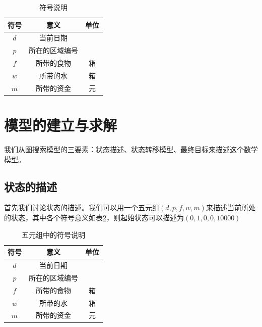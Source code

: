\documentclass[withoutpreface,bwprint]{cumcmthesis} %
\begin{document}
\begin{table}[!htbp]
    \caption{符号说明}\label{tab:001} \centering
    \begin{tabular}{ccc}
        \toprule[1.5pt]
        符号 & 意义 & 单位\\
        \midrule[1pt]
        $d$ & 当前日期 & \\
        $p$ & 所在的区域编号 & \\
        $f$ & 所带的食物 & 箱\\
        $w$ & 所带的水 & 箱\\
        $m$ & 所带的资金 & 元\\
        \bottomrule[1.5pt]
    \end{tabular}
\end{table}

\section{模型的建立与求解}

我们从图搜索模型的三要素：状态描述、状态转移模型、最终目标来描述这个数学模型。

\subsection{状态的描述}
首先我们讨论状态的描述。我们可以用一个五元组\((d,p,f,w,m)\)来描述当前所处的状态，其中各个符号意义如表\ref{zt}，则起始状态可以描述为\((0,1,0,0,10000)\)
\begin{table}[!htbp]
    \caption{五元组中的符号说明}\label{tab:001} \centering
    \begin{tabular}{ccc}
        \toprule[1.5pt]
        符号 & 意义 & 单位\\
        \midrule[1pt]
        $d$ & 当前日期 & \\
        $p$ & 所在的区域编号 & \\
        $f$ & 所带的食物 & 箱\\
        $w$ & 所带的水 & 箱\\
        $m$ & 所带的资金 & 元\\
        \bottomrule[1.5pt]
    \end{tabular}
    \label{zt}
\end{table}
\end{document}
